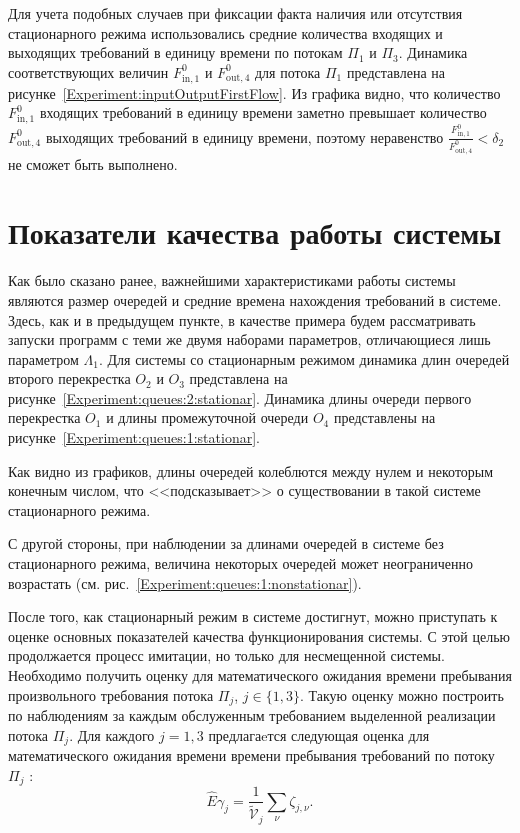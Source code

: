 Для учета подобных случаев при фиксации факта наличия или отсутствия стационарного режима использовались средние количества входящих и выходящих требований в единицу времени по потокам $\Pi_1$ и $\Pi_3$. Динамика соответствующих величин $F^{0}_{\text{in},1}$ и $F^{0}_{\text{out},4} $ для потока $\Pi_1$ представлена на рисунке~\ref{Experiment:inputOutputFirstFlow}. Из графика видно, что количество $F^{0}_{\text{in},1}$ входящих требований в единицу времени заметно превышает количество $F^{0}_{\text{out},4}$ выходящих требований в единицу времени, поэтому неравенство $\frac{F^{0}_{\text{in},1}}{F^{0}_{\text{out},4}} < \delta_2$ не сможет быть выполнено. 


\section{Показатели качества работы системы}
Как было сказано ранее, важнейшими характеристиками работы системы являются размер очередей и средние времена нахождения требований в системе. Здесь, как и в предыдущем пункте, в качестве примера будем рассматривать запуски программ с теми же двумя наборами параметров, отличающиеся лишь параметром $\Lambda_1$. Для системы со стационарным режимом динамика длин очередей второго перекрестка $O_2$ и $O_3$ представлена на рисунке~\ref{Experiment:queues:2:stationar}. Динамика длины очереди первого перекрестка $O_1$ и длины промежуточной очереди $O_4$ представлены на рисунке~\ref{Experiment:queues:1:stationar}.





Как видно из графиков, длины очередей колеблются между нулем и некоторым конечным числом, что <<подсказывает>> о существовании в такой системе стационарного режима.

%
С другой стороны, при наблюдении за длинами очередей в системе без стационарного режима, величина некоторых очередей может неограниченно возрастать (см. рис.~\ref{Experiment:queues:1:nonstationar}).



После того, как стационарный режим в системе достигнут, можно приступать к оценке основных показателей качества функционирования системы. С этой целью продолжается процесс имитации, но только для несмещенной системы. Необходимо получить оценку для математического ожидания времени пребывания произвольного требования потока $\Pi_j$, $j\in \{1, 3\}$.
Такую оценку можно построить по наблюдениям за каждым обслуженным требованием выделенной реализации потока $\Pi_j$.
Для каждого $j=1,3$ предлагаeтся следующая оценка для математического ожидания времени времени пребывания требований по потоку $\Pi_j$ :
\begin{equation*}
    \hat{E}\gamma_{j}=\frac{1}{\tilde{\mathcal{V}}_j}\sum_{\nu}\zeta_{j,\nu}.
\end{equation*}

